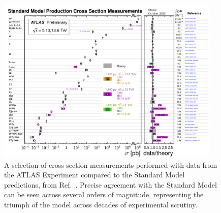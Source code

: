 \begin{figure}[htb]
    \centering
    \includegraphics[width=0.95\textwidth]{fig/atlas/atlas_xsecs_2023.pdf}
    \caption[A selection of cross section measurements performed with data from the ATLAS Experiment]{
        A selection of cross section measurements performed with data from the ATLAS Experiment compared to the Standard Model predictions, from Ref.~\cite{ATL-PHYS-PUB-2023-039}. 
        Precise agreement with the Standard Model can be seen across several orders of magnitude, representing the triumph of the model across decades of experimental scrutiny. 
    }
    \label{fig:atlas_xsecs}
\end{figure}

